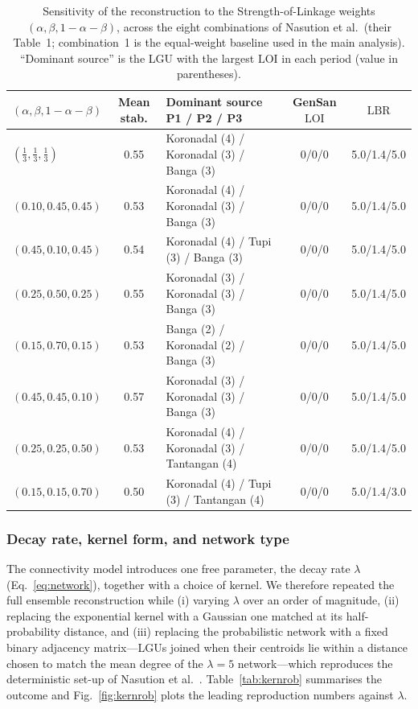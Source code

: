 \documentclass[a4paper,11pt]{article}
\begin{document}
\begin{table}[htbp]
\centering
\caption{Sensitivity of the reconstruction to the Strength-of-Linkage weights
$(\alpha,\beta,1{-}\alpha{-}\beta)$, across the eight combinations of Nasution
et al.\ (their Table~1; combination~1 is the equal-weight baseline used in the main
analysis). ``Dominant source'' is the LGU with the largest $\mathrm{LOI}$ in each period
(value in parentheses).}
\label{tab:sens}
\footnotesize
\setlength{\tabcolsep}{4pt}
\begin{tabular}{lc>{\raggedright\arraybackslash}p{5.6cm}cc}
\toprule
\textbf{$(\alpha,\beta,1{-}\alpha{-}\beta)$} & \textbf{Mean stab.} &
\textbf{Dominant source P1 / P2 / P3} & \textbf{GenSan $\mathrm{LOI}$} & \textbf{$\mathrm{LBR}$} \\
\midrule
$(\tfrac13,\tfrac13,\tfrac13)$ & 0.55 & Koronadal (4) / Koronadal (3) / Banga (3) & 0/0/0 & 5.0/1.4/5.0 \\
$(0.10,0.45,0.45)$ & 0.53 & Koronadal (4) / Koronadal (3) / Banga (3) & 0/0/0 & 5.0/1.4/5.0 \\
$(0.45,0.10,0.45)$ & 0.54 & Koronadal (4) / Tupi (3) / Banga (3) & 0/0/0 & 5.0/1.4/5.0 \\
$(0.25,0.50,0.25)$ & 0.55 & Koronadal (3) / Koronadal (3) / Banga (3) & 0/0/0 & 5.0/1.4/5.0 \\
$(0.15,0.70,0.15)$ & 0.53 & Banga (2) / Koronadal (2) / Banga (3) & 0/0/0 & 5.0/1.4/5.0 \\
$(0.45,0.45,0.10)$ & 0.57 & Koronadal (3) / Koronadal (3) / Banga (3) & 0/0/0 & 5.0/1.4/5.0 \\
$(0.25,0.25,0.50)$ & 0.53 & Koronadal (4) / Koronadal (3) / Tantangan (4) & 0/0/0 & 5.0/1.4/5.0 \\
$(0.15,0.15,0.70)$ & 0.50 & Koronadal (4) / Tupi (3) / Tantangan (4) & 0/0/0 & 5.0/1.4/3.0 \\
\bottomrule
\end{tabular}
\end{table}

\subsubsection*{Decay rate, kernel form, and network type}
The connectivity model introduces one free parameter, the decay rate $\lambda$
(Eq.~\ref{eq:network}), together with a choice of kernel. We therefore repeated the
full ensemble reconstruction while (i) varying $\lambda$ over an order of magnitude,
(ii) replacing the exponential kernel with a Gaussian one matched at its
half-probability distance, and (iii) replacing the probabilistic network with a fixed
binary adjacency matrix---LGUs joined when their centroids lie within a distance
chosen to match the mean degree of the $\lambda=5$ network---which reproduces the
deterministic set-up of Nasution et al.\ \cite{Nasution2024}. Table~\ref{tab:kernrob}
summarises the outcome and Fig.~\ref{fig:kernrob} plots the leading reproduction
numbers against $\lambda$.
\end{document}
